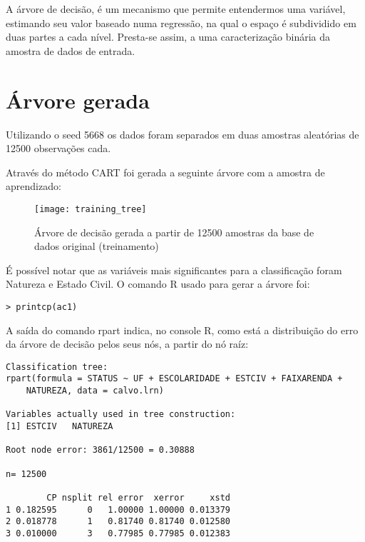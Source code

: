 \label{chap:DecisionTree}A árvore de decisão, é um mecanismo que permite entendermos uma variável,
estimando seu valor baseado numa regressão, na qual o espaço é subdividido
em duas partes a cada nível. Presta-se assim, a uma caracterização
binária da amostra de dados de entrada.


\section{Árvore gerada}

Utilizando o seed 5668 os dados foram separados em duas amostras aleatórias
de 12500 observações cada.

Através do método CART foi gerada a seguinte árvore com a amostra
de aprendizado:

\begin{center}
\begin{figure}[h]
\begin{centering}
\texttt{[image: training\_tree]}
\par\end{centering}
\caption{\label{fig:TrainingTree}Árvore de decisão gerada a partir de 12500 amostras da base de dados original (treinamento)}
\end{figure}
\vspace*{-40pt}
\par\end{center}

É possível notar que as variáveis mais significantes para a classificação
foram Natureza e Estado Civil. O comando R usado para gerar a árvore foi:

\begin{verbatim}
> printcp(ac1)
\end{verbatim}


A saída do comando rpart indica, no console R, como está a distribuição do erro da árvore de decisão pelos seus nós, a partir do nó raíz:

\begin{lstlisting}
Classification tree:
rpart(formula = STATUS ~ UF + ESCOLARIDADE + ESTCIV + FAIXARENDA + 
    NATUREZA, data = calvo.lrn)
 
Variables actually used in tree construction:
[1] ESTCIV   NATUREZA
 
Root node error: 3861/12500 = 0.30888
 
n= 12500 
 
        CP nsplit rel error  xerror     xstd
1 0.182595      0   1.00000 1.00000 0.013379
2 0.018778      1   0.81740 0.81740 0.012580
3 0.010000      3   0.77985 0.77985 0.012383
\end{lstlisting}


